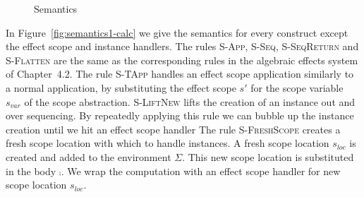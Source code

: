 {\begin{figure}[h]
\caption{Semantics}
\centering
{}
\end{figure}

In Figure~\ref{fig:semantics1-calc} we give the semantics for every construct except the effect scope and instance handlers.
The rules \textsc{S-App}, \textsc{S-Seq}, \textsc{S-SeqReturn} and \textsc{S-Flatten} are the same as the corresponding rules in the
algebraic effects system of Chapter~4.2.
The rule \textsc{S-TApp} handles an effect scope application similarly to a normal application, by substituting the effect scope $s'$ for the scope variable $s_{var}$ of the scope abstraction.
\textsc{S-LiftNew} lifts the creation of an instance out and over sequencing.
By repeatedly applying this rule we can bubble up the instance creation until we hit an effect scope handler
The rule \textsc{S-FreshScope} creates a fresh scope location with which to handle instances.
A fresh scope location $s_{loc}$ is created and added to the environment $\Sigma$.
This new scope location is substituted in the body $\comp$.
We wrap the computation with an effect scope handler for new scope location $s_{loc}$.

}
